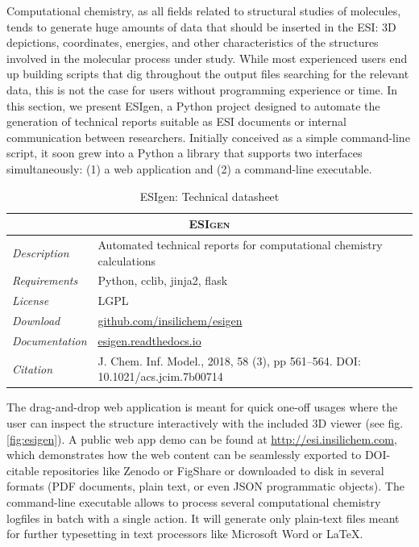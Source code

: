 Computational chemistry, as all fields related to structural studies of molecules, tends to generate huge amounts of data that should be inserted in the ESI: 3D depictions, coordinates, energies, and other characteristics of the structures involved in the molecular process under study. While most experienced users end up building scripts that dig throughout the output files searching for the relevant data, this is not the case for users without programming experience or time. In this section, we present ESIgen, a Python project designed to automate the generation of technical reports suitable as ESI documents or internal communication between researchers. Initially conceived as a simple command-line script, it soon grew into a Python a library that supports two interfaces simultaneously: (1) a web application and (2) a command-line executable.


\begin{table}[hbtp]
	\caption{ESIgen: Technical datasheet}
	\footnotesize
	\newcommand{\tableheading}[1]{\multicolumn{2}{c}{\textsc{#1}}}
	\begin{tabularx}{\textwidth}{RL}
		\toprule
		\tableheading{ESIgen}\\
		\toprule
		\textit{Description} & Automated technical reports for computational chemistry calculations \\
		\midrule
		\textit{Requirements} & Python, cclib, jinja2, flask \\
		\midrule
		\textit{License} & LGPL \\
		\midrule
		\textit{Download} & \href{https://github.com/insilichem/esigen}{github.com/insilichem/esigen} \\
		\midrule
		\textit{Documentation} & \href{http://esigen.readthedocs.io}{esigen.readthedocs.io} \\
		\midrule
		\textit{Citation} & J. Chem. Inf. Model., 2018, 58 (3), pp 561–564. DOI: 10.1021/acs.jcim.7b00714 \\
		\bottomrule

	\end{tabularx}
\end{table}

The drag-and-drop web application is meant for quick one-off usages where the user can inspect the structure interactively with the included 3D viewer (see fig. \ref{fig:esigen}). A public web app demo can be found at \href{esi.insilichem.com}{http://esi.insilichem.com}, which demonstrates how the web content can be seamlessly exported to DOI-citable repositories like Zenodo or FigShare or downloaded to disk in several formats (PDF documents, plain text, or even JSON programmatic objects). The command-line executable allows to process several computational chemistry logfiles in batch with a single action. It will generate only plain-text files meant for further typesetting in text processors like Microsoft Word or LaTeX.



